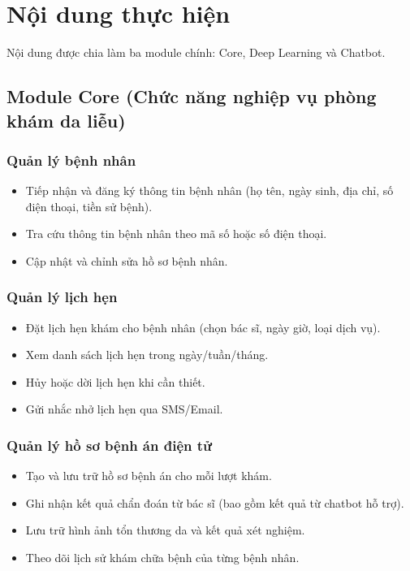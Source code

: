 \documentclass[12pt,a4paper]{article}
\begin{document}
\section{Nội dung thực hiện}

Nội dung được chia làm ba module chính: Core, Deep Learning và Chatbot.

\subsection{Module Core (Chức năng nghiệp vụ phòng khám da liễu)}

\subsubsection{Quản lý bệnh nhân}
\begin{itemize}
    \item Tiếp nhận và đăng ký thông tin bệnh nhân (họ tên, ngày sinh, địa chỉ, số điện thoại, tiền sử bệnh).
    \item Tra cứu thông tin bệnh nhân theo mã số hoặc số điện thoại.
    \item Cập nhật và chỉnh sửa hồ sơ bệnh nhân.
\end{itemize}

\subsubsection{Quản lý lịch hẹn}
\begin{itemize}
    \item Đặt lịch hẹn khám cho bệnh nhân (chọn bác sĩ, ngày giờ, loại dịch vụ).
    \item Xem danh sách lịch hẹn trong ngày/tuần/tháng.
    \item Hủy hoặc dời lịch hẹn khi cần thiết.
    \item Gửi nhắc nhở lịch hẹn qua SMS/Email.
\end{itemize}

\subsubsection{Quản lý hồ sơ bệnh án điện tử}
\begin{itemize}
    \item Tạo và lưu trữ hồ sơ bệnh án cho mỗi lượt khám.
    \item Ghi nhận kết quả chẩn đoán từ bác sĩ (bao gồm kết quả từ chatbot hỗ trợ).
    \item Lưu trữ hình ảnh tổn thương da và kết quả xét nghiệm.
    \item Theo dõi lịch sử khám chữa bệnh của từng bệnh nhân.
\end{itemize}
\end{document}

